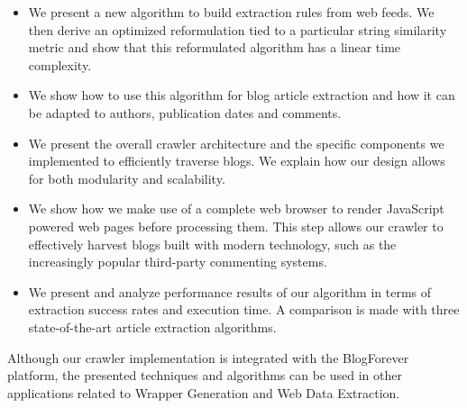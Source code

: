 \begin{itemize}
  \item We present a new algorithm to build extraction rules from web feeds. We then derive an optimized reformulation tied to a particular string similarity metric and show that this reformulated algorithm has a linear time complexity.
  \item We show how to use this algorithm for blog article extraction and how it can be adapted to authors, publication dates and comments.
  \item We present the overall crawler architecture and the specific components we implemented to efficiently traverse blogs. We explain how our design allows for both modularity and scalability.
  \item We show how we make use of a complete web browser to render JavaScript powered web pages before processing them. This step allows our crawler to effectively harvest blogs built with modern technology, such as the increasingly popular third-party commenting systems.
  \item We present and analyze performance results of our algorithm in terms of extraction success rates and execution time. A comparison is made with three state-of-the-art article extraction algorithms.
\end{itemize}

Although our crawler implementation is integrated with the BlogForever platform, the presented techniques and algorithms can be used in other applications related to Wrapper Generation and Web Data Extraction.
